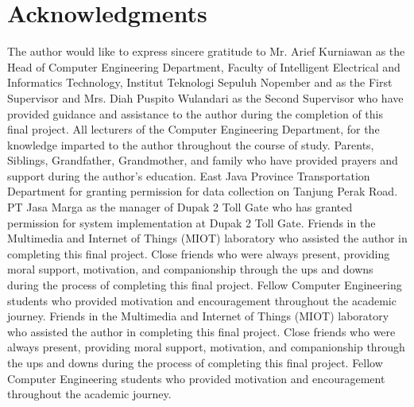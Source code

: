 \section*{Acknowledgments}

The author would like to express sincere gratitude to Mr. Arief Kurniawan as the Head of Computer Engineering Department, Faculty of Intelligent Electrical and Informatics Technology, Institut Teknologi Sepuluh Nopember and as the First Supervisor and Mrs. Diah Puspito Wulandari as the Second Supervisor who have provided guidance and assistance to the author during the completion of this final project. All lecturers of the Computer Engineering Department, for the knowledge imparted to the author throughout the course of study. Parents, Siblings, Grandfather, Grandmother, and family who have provided prayers and support during the author's education. East Java Province Transportation Department for granting permission for data collection on Tanjung Perak Road. PT Jasa Marga as the manager of Dupak 2 Toll Gate who has granted permission for system implementation at Dupak 2 Toll Gate. Friends in the Multimedia and Internet of Things (MIOT) laboratory who assisted the author in completing this final project. Close friends who were always present, providing moral support, motivation, and companionship through the ups and downs during the process of completing this final project. Fellow Computer Engineering students who provided motivation and encouragement throughout the academic journey. Friends in the Multimedia and Internet of Things (MIOT) laboratory who assisted the author in completing this final project. Close friends who were always present, providing moral support, motivation, and companionship through the ups and downs during the process of completing this final project. Fellow Computer Engineering students who provided motivation and encouragement throughout the academic journey. 